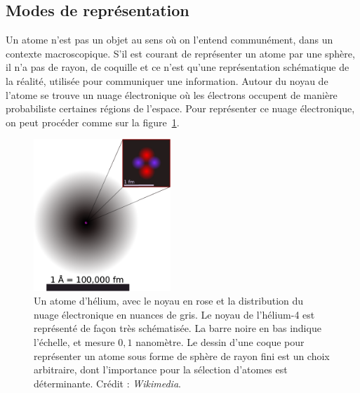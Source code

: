 	
	
	\subsection{Modes de représentation}
	Un atome n'est pas un objet au sens où on l'entend communément, dans un contexte macroscopique. S'il est courant de représenter un atome par une sphère, il n'a pas de rayon, de \og coquille \fg{} et ce n'est qu'une représentation schématique de la réalité, utilisée pour communiquer une information. Autour du noyau de l'atome se trouve un nuage électronique où les électrons occupent de manière probabiliste certaines régions de l'espace. Pour représenter ce nuage électronique, on peut procéder comme sur la figure~\ref{fig:helium}.

	
	\begin{figure}
		\centering
		\includegraphics[width=0.46\textwidth]{figures/ch1/helium}
		\caption[Un atome d'hélium avec son nuage électronique]{Un atome d'hélium, avec le noyau en rose et la distribution du nuage électronique en nuances de gris. Le noyau de l'hélium-4 est représenté de façon très schématisée. La barre noire en bas indique l'échelle, et mesure $0,1$ nanomètre. Le dessin d'une \og coque \fg{}  pour représenter un atome sous forme de sphère de rayon fini est un choix arbitraire, dont l'importance pour la sélection d'atomes est déterminante. Crédit : \emph{Wikimedia}.}
		\label{fig:helium}
	\end{figure}
	
